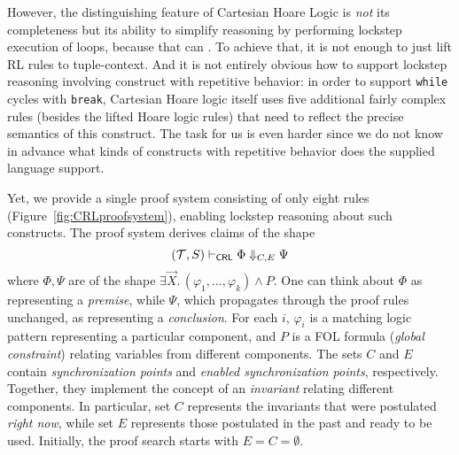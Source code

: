 However, the distinguishing feature of Cartesian Hoare Logic is \emph{not} its
completeness but its ability to simplify reasoning by performing lockstep
execution of loops, because that can .
To achieve that, it is not enough to 
just lift RL rules to tuple-context. And it is not entirely obvious how
to support lockstep reasoning involving construct with repetitive behavior: in
order to support \texttt{while} cycles with \texttt{break}, Cartesian Hoare logic itself uses
five additional fairly complex rules (besides the lifted Hoare logic rules) 
that need to reflect the precise semantics of this construct.  The task for
us is even harder since we do not know in advance what kinds of constructs with
repetitive behavior does the supplied language support.

Yet, we provide a single proof system consisting of only eight rules (Figure~\ref{fig:CRLproofsystem}),
enabling lockstep reasoning about such constructs.
The proof system derives claims of the shape
\begin{equation*}
(\mathcal{T}, S) \vdash_{\mathsf{CRL}} \Phi \Downarrow_{C,E} \Psi
\end{equation*}
where $\Phi,\Psi$ are of the shape $\exists \vec{X}.\, (\varphi_1, \ldots, \varphi_k) \land P$.
One can think about $\Phi$ as representing a \emph{premise}, while
$\Psi$, which propagates through the proof rules unchanged, as representing a
\emph{conclusion}.  For each $i$, $\varphi_i$ is a matching logic
pattern representing a particular component, and $P$ is a FOL
formula (\emph{global constraint}) relating variables from different
components.  The sets $C$ and $E$ contain \emph{synchronization points} and \emph{enabled
  synchronization points}, respectively.  Together, they implement the concept of an
\emph{invariant} relating different components.  In particular, set $C$
represents the invariants that were postulated \emph{right now}, while set
$E$ represents those postulated in the past and ready to be used.
Initially, the proof search starts with $E = C = \emptyset$.

